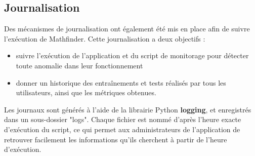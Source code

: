 \documentclass[french]{article}
\begin{document}
    \subsection{Journalisation}
    Des mécanismes de journalisation ont également été mis en place afin de suivre l'exécution de Mathfinder. Cette journalisation a deux objectifs :
    \begin{itemize}
        \item suivre l'exécution de l'application et du script de monitorage pour détecter toute anomalie dans leur fonctionnement
        \item donner un historique des entraînements et tests réalisés par tous les utilisateurs, ainsi que les métriques obtenues.
    \end{itemize}
    Les journaux sont générés à l'aide de la librairie Python \textbf{logging}, et enregistrés dans un sous-dossier "logs". Chaque fichier est nommé d'après l'heure exacte d'exécution du script, ce qui permet aux administrateurs de l'application de retrouver facilement les informations qu'ils cherchent à partir de l'heure d'exécution.
\end{document}
